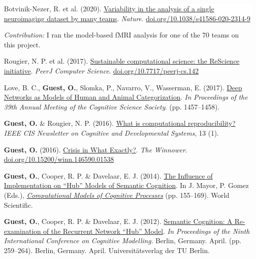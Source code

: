 \documentclass[10pt]{article}
\newcommand{\paper}[2]{\colorbox{white}{\begin{minipage}{\dimexpr\linewidth-2\fboxsep}#1
\end{minipage}}
\begin{flushright}
\begin{minipage}{0.99\dimexpr\linewidth-2\fboxsep}\small
\emph{Contribution:} #2
\end{minipage}
\end{flushright}}
\begin{document}
\paper{Botvinik-Nezer, R. et al. (2020). \href{https://doi.org/10.1038/s41586-020-2314-9}{Variability in the analysis of a single neuroimaging dataset by many teams}. \textit{Nature}. \href{https://doi.org/10.1038/s41586-020-2314-9}{doi.org/10.1038/s41586-020-2314-9}}{I ran the model-based fMRI analysis for one of the 70 teams on this project.}

Rougier, N. P. et al. (2017). \href{http://dx.doi.org/10.7717/peerj-cs.142}{Sustainable computational science: the ReScience initiative}. \textit{PeerJ Computer Science}. \href{http://dx.doi.org/10.7717/peerj-cs.142}{doi.org/10.7717/peerj-cs.142}
\vspace{8pt}

Love, B. C., \textbf{Guest, O.}, Slomka, P., Navarro, V., Wasserman, E. (2017). \href{https://mindmodeling.org/cogsci2017/papers/0283/index.html}{Deep Networks as Models of Human and Animal Categorization}. \textit{In Proceedings of the 39th Annual Meeting of	the	Cognitive Science	Society}. (pp. 1457--1458).
\vspace{8pt}

\textbf{Guest, O.} \& Rougier, N. P. (2016). \href{https://oliviaguest.com/doc/guest_rougier_2016.pdf}{What is computational reproducibility?} \textit{IEEE CIS Newsletter on Cognitive and Developmental Systems}, 13 (1).
\vspace{8pt}

\textbf{Guest, O.} (2016). \href{http://dx.doi.org/10.15200/winn.146590.01538}{Crisis in What Exactly?}. \textit{The Winnower}. \newline
\href{http://dx.doi.org/10.15200/winn.146590.01538}{doi.org/10.15200/winn.146590.01538}
\vspace{8pt}

\textbf{Guest, O.}, Cooper, R. P. \& Davelaar, E. J. (2014).   \href{http://oliviaguest.com/doc/guest_14.pdf}{The Influence of Implementation on ``Hub'' Models of Semantic Cognition}. In J. Mayor, P. Gomez (Eds.), \textit{\href{http://www.worldscientific.com/worldscibooks/10.1142/8747}{Computational Models of Cognitive Processes}} (pp. 155--169). World Scientific.
\vspace{8pt}

\textbf{Guest, O.}, Cooper, R. P. \& Davelaar, E. J. (2012). \href{http://eprints.bbk.ac.uk/6758/}{Semantic Cognition: A Re-examination of the Recurrent Network ``Hub'' Model}. \textit{In Proceedings of the Ninth International Conference on Cognitive Modelling.} Berlin, Germany. April. (pp. 259--264). Berlin, Germany. April. Universit\"{a}tsverlag der TU Berlin.
\end{document}
